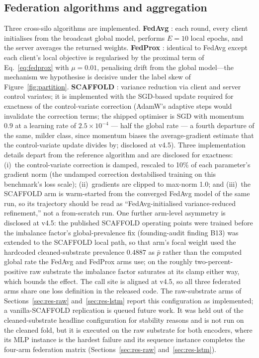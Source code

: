 \subsection{Federation algorithms and aggregation}

Three cross-silo algorithms are implemented. \textbf{FedAvg}
\cite{mcmahan2017}: each round, every client initialises from the
broadcast global model, performs $E=10$ local epochs, and the server
averages the returned weights. \textbf{FedProx} \cite{li2020}: identical
to FedAvg except each client's local objective is regularised by the
proximal term of Eq.~\eqref{eq:fedprox} with
$\mu = 0.01$, penalising drift from the global model---the mechanism
we hypothesise is decisive under the label skew of
Figure~\ref{fig:partition}. \textbf{SCAFFOLD} \cite{karimireddy2020}:
variance reduction via client and server control variates; it is
implemented with the SGD-based update required for exactness of the
control-variate correction (AdamW's adaptive steps would invalidate
the correction terms; the shipped optimiser is SGD with momentum
$0.9$ at a learning rate of $2.5\times10^{-4}$ --- half the global
rate --- a fourth departure of the same, milder class, since momentum
biases the average-gradient estimate that the control-variate update
divides by; disclosed at v4.5). Three implementation details depart from the
reference algorithm and are disclosed for exactness: (i)\ the
control-variate correction is damped, rescaled to 10\% of each
parameter's gradient norm (the undamped correction destabilised
training on this benchmark's loss scale); (ii)\ gradients are clipped
to max-norm 1.0; and (iii)\ the SCAFFOLD arm is warm-started from
the converged FedAvg model of the same run, so its trajectory should
be read as ``FedAvg-initialised variance-reduced refinement,'' not a
from-scratch run. One further arm-level asymmetry is disclosed at
v4.5: the published SCAFFOLD operating points were trained before the
imbalance factor's global-prevalence fix (founding-audit finding B13)
was extended to the SCAFFOLD local path, so that arm's focal weight
used the hardcoded cleaned-substrate prevalence $0.4887$ as
$\bar{p}$ rather than the computed global rate the FedAvg and
FedProx arms use; on the roughly two-percent-positive raw substrate
the imbalance factor saturates at its clamp either way, which bounds
the effect. The call site is aligned at v4.5, so all three federated
arms share one loss definition in the released code. The raw-substrate arms of
Sections~\ref{sec:res-raw} and~\ref{sec:res-lstm} report this
configuration as implemented; a vanilla-SCAFFOLD replication is
queued future work. It was held out of the cleaned-substrate
headline configuration for stability reasons and is not run on the
cleaned fold, but it is executed on the raw substrate for both
encoders, where its MLP instance is the hardest failure and its
sequence instance completes the four-arm federation matrix
(Sections~\ref{sec:res-raw} and~\ref{sec:res-lstm}).


